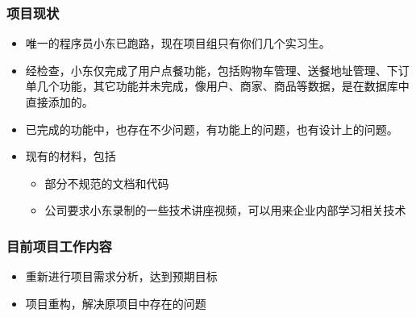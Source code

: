 \subsubsection{项目现状}
\begin{itemize}
\item 唯一的程序员小东已跑路，现在项目组只有你们几个实习生。
\item 经检查，小东仅完成了用户点餐功能，包括购物车管理、送餐地址管理、下订单几个功能，其它功能并未完成，像用户、商家、商品等数据，是在数据库中直接添加的。
\item 已完成的功能中，也存在不少问题，有功能上的问题，也有设计上的问题。
\item 现有的材料，包括
\begin{itemize}
    \item 部分不规范的文档和代码
    \item 公司要求小东录制的一些技术讲座视频，可以用来企业内部学习相关技术
\end{itemize}
\end{itemize}
\subsubsection{目前项目工作内容}
\begin{itemize}
    \item 重新进行项目需求分析，达到预期目标
    \item 项目重构，解决原项目中存在的问题
\end{itemize}













